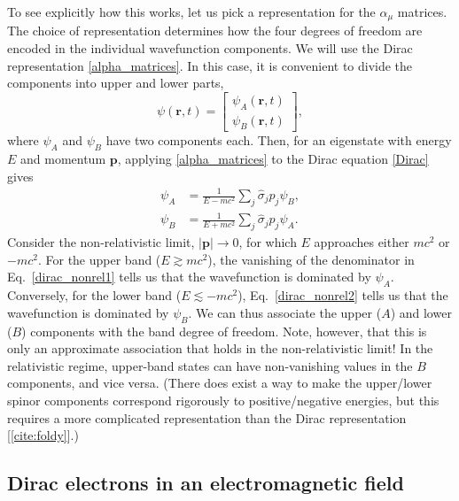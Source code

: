 \documentclass[prx,12pt]{revtex4-2}
\begin{document}
To see explicitly how this works, let us pick a representation for the
$\hat{\alpha}_\mu$ matrices.  The choice of representation determines
how the four degrees of freedom are encoded in the individual
wavefunction components.  We will use the Dirac representation
\eqref{alpha_matrices}.  In this case, it is convenient to divide the
components into upper and lower parts,
\begin{equation}
  \psi(\mathbf{r},t) = \begin{bmatrix}\psi_A(\mathbf{r},t)
    \\ \psi_B(\mathbf{r},t)
  \end{bmatrix},
\end{equation}
where $\psi_A$ and $\psi_B$ have two components each.  Then, for an
eigenstate with energy $E$ and momentum $\mathbf{p}$, applying
\eqref{alpha_matrices} to the Dirac equation \eqref{Dirac} gives
\begin{align}
  \psi_A &= \frac{1}{E - mc^2} \sum_j \hat{\sigma}_j p_j \psi_B,
  \label{dirac_nonrel1} \\
  \psi_B &= \frac{1}{E + mc^2} \sum_j \hat{\sigma}_j p_j \psi_A.
  \label{dirac_nonrel2}
\end{align}
Consider the non-relativistic limit, $|\mathbf{p}| \rightarrow 0$, for
which $E$ approaches either $mc^2$ or $-mc^2$.  For the upper band ($E
\gtrsim mc^2$), the vanishing of the denominator in
Eq.~\eqref{dirac_nonrel1} tells us that the wavefunction is dominated
by $\psi_A$.  Conversely, for the lower band ($E \lesssim -mc^2$),
Eq.~\eqref{dirac_nonrel2} tells us that the wavefunction is dominated
by $\psi_B$.  We can thus associate the upper ($A$) and lower ($B$)
components with the band degree of freedom.  Note, however, that this
is only an approximate association that holds in the non-relativistic
limit!  In the relativistic regime, upper-band states can have
non-vanishing values in the $B$ components, and vice versa.  (There
does exist a way to make the upper/lower spinor components correspond
rigorously to positive/negative energies, but this requires a more
complicated representation than the Dirac representation
[\ref{cite:foldy}].)

\subsection{Dirac electrons in an electromagnetic field}
\label{sec:diracem}
\end{document}
